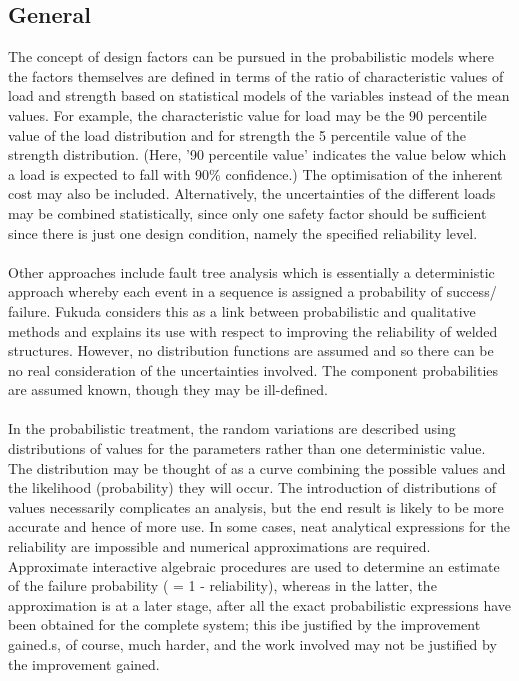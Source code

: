 \documentclass[12pt]{article}
\begin{document}
\subsection{General}
The concept of design factors can be pursued in the probabilistic models where the
factors themselves are defined in terms of the ratio of characteristic values of load
and strength based on statistical models of the variables instead of the mean values.
For example, the characteristic value for load may be the 90 percentile value of the
load distribution and for strength the 5 percentile value of the strength distribution.
(Here, '90 percentile value' indicates the value below which a load is expected to fall
with 90\% confidence.) The optimisation of the inherent cost may also be included.
Alternatively, the uncertainties of the different loads may be combined statistically, 
since only one safety factor should be sufficient since there is just one design
condition, namely the specified reliability level.\\\\
Other approaches include fault tree analysis which is essentially a deterministic
approach whereby each event in a sequence is assigned a probability of success/
failure. Fukuda considers this as a link between probabilistic and qualitative
methods and explains its use with respect to improving the reliability of welded
structures. However, no distribution functions are assumed and so there can be no
real consideration of the uncertainties involved. The component probabilities are
assumed known, though they may be ill-defined.\\\\
In the probabilistic treatment, the random variations are described using
distributions of values for the parameters rather than one deterministic value. The
distribution may be thought of as a curve combining the possible values and the
likelihood (probability) they will occur. The introduction of distributions of values
necessarily complicates an analysis, but the end result is likely to be more accurate
and hence of more use. In some cases, neat analytical expressions for the reliability
are impossible and numerical approximations are required. 
Approximate interactive algebraic procedures are used to determine an estimate of
the failure probability ( = 1 - reliability), whereas in the latter, the approximation is
at a later stage, after all the exact probabilistic expressions have been obtained for
the complete system; this ibe justified by the improvement gained.s, of course, much harder, and the work involved may not be justified by the improvement gained.
\end{document}
